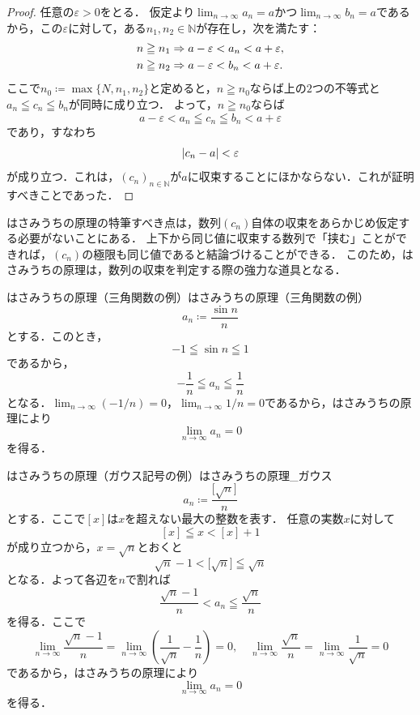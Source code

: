 \begin{tleftbar}
  \begin{proof}
    任意の$\varepsilon > 0$をとる．
    仮定より$\lim_{n \to \infty} a_n = a$かつ$\lim_{n \to \infty} b_n = a$であるから，この$\varepsilon$に対して，ある$n_1,n_2 \in \mathbb{N}$が存在し，次を満たす：
    \begin{align*}
      n \geqq n_1 &\mathrel{\Rightarrow} a - \varepsilon < a_n < a + \varepsilon, \\
      n \geqq n_2 &\mathrel{\Rightarrow} a - \varepsilon < b_n < a + \varepsilon.
    \end{align*}
    ここで$n_0 \coloneqq \max \{ N, n_1, n_2 \}$と定めると，$n \geqq n_0$ならば上の$2$つの不等式と$a_n \leqq c_n \leqq b_n$が同時に成り立つ．
    よって，$n \geqq n_0$ならば
    \[
      a - \varepsilon < a_n \leqq c_n \leqq b_n < a + \varepsilon
    \]
    であり，すなわち
    \[
      \lvert c_n - a\rvert < \varepsilon
    \]
    が成り立つ．これは，$(c_n)_{n \in \mathbb{N}}$が$a$に収束することにほかならない．これが証明すべきことであった．
  \end{proof}
\end{tleftbar}

\begin{remark}[はさみうちの原理の強み]
  はさみうちの原理の特筆すべき点は，数列$(c_n)$自体の収束をあらかじめ仮定する必要がないことにある．
  上下から同じ値に収束する数列で「挟む」ことができれば，$(c_n)$の極限も同じ値であると結論づけることができる．
  このため，はさみうちの原理は，数列の収束を判定する際の強力な道具となる．
\end{remark}

\begin{example}{はさみうちの原理（三角関数の例）}{はさみうちの原理（三角関数の例）}
  \[
    a_n \coloneqq \frac{\sin n}{n}
  \]
  とする．このとき，
  \[
    -1 \leqq \sin n \leqq 1
  \]
  であるから，
  \[
    -\frac{1}{n} \leqq a_n \leqq \frac{1}{n}
  \]
  となる．$\lim_{n \to \infty} (-1/n) = 0$，$\lim_{n \to \infty} 1/n = 0$であるから，はさみうちの原理により
  \[
    \lim_{n \to \infty} a_n = 0
  \]
  を得る．
\end{example}

\begin{example}{はさみうちの原理（ガウス記号の例）}{はさみうちの原理_ガウス}
  \[
    a_n \coloneqq \frac{\bigl[ \sqrt{n} \bigr]}{n}
  \]
  とする．ここで$[x]$は$x$を超えない最大の整数を表す．
  任意の実数$x$に対して
  \[
    [x] \leqq x < [x] + 1
  \]
  が成り立つから，$x=\sqrt{n}$とおくと
  \[
    \sqrt{n}-1 < \bigl[\sqrt{n}\bigr] \leqq \sqrt{n}
  \]
  となる．よって各辺を$n$で割れば
  \[
    \frac{\sqrt{n}-1}{n} < a_n \leqq \frac{\sqrt{n}}{n}
  \]
  を得る．ここで
  \[
    \lim_{n\to\infty}\frac{\sqrt{n}-1}{n}
    = \lim_{n\to\infty}\left(\frac{1}{\sqrt{n}}-\frac{1}{n}\right)=0,
    \quad
    \lim_{n\to\infty}\frac{\sqrt{n}}{n}
    =\lim_{n\to\infty}\frac{1}{\sqrt{n}}=0
  \]
  であるから，はさみうちの原理により
  \[
    \lim_{n\to\infty} a_n = 0
  \]
  を得る．
\end{example}


